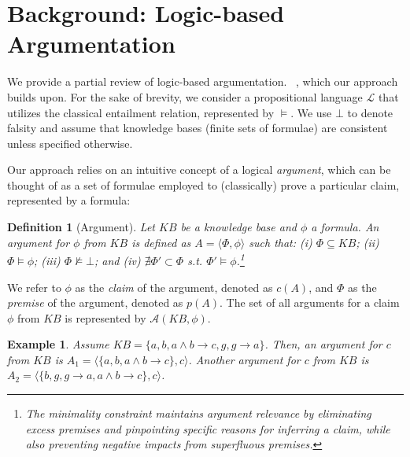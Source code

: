 \documentclass[letterpaper]{article} %
\newtheorem{definition}{{\bf Definition}}
\newtheorem{example}{\bf Example}
\begin{document}
\section{Background: Logic-based Argumentation}
\label{sec:background}





We provide a partial review of logic-based argumentation. ~\cite{besnard2014constructing}, which our approach builds upon.
For the sake of brevity, we consider a propositional language $\mathcal{L}$ that utilizes the classical entailment relation, represented by $\models$. We use $\bot$ to denote falsity and assume that 
knowledge bases (finite sets of formulae) %
are consistent unless specified otherwise.

Our approach relies on an intuitive concept of a logical \emph{argument}, which can be thought of as a set of formulae employed to (classically) prove a particular claim, represented by a formula:

\begin{definition}[Argument]
    Let $KB$ be a knowledge base and $\phi$ a formula. An \emph{argument} for $\phi$ from $KB$ is defined as $A = \langle \Phi, \phi \rangle$ such that: (i) $\Phi \subseteq KB$; (ii) $\Phi \models \phi$; (iii) $\Phi \not \models \bot$; and (iv) $\nexists \Phi' \subset \Phi$ s.t. $\Phi' \models \phi$.\footnote{The minimality constraint maintains argument relevance by eliminating excess premises and pinpointing specific reasons for inferring a claim, while also preventing negative impacts from superfluous premises.}
    \label{def:arg}
\end{definition}


\noindent We refer to $\phi$ as the \emph{claim} of the argument, denoted as $c(A)$, and $\Phi$ as the \emph{premise} of the argument, denoted as $p(A)$. The set of all arguments for a claim $\phi$ from $KB$ is represented by $\mathcal{A}(KB, \phi)$.



\begin{example}
Assume $KB = \{a, b, a \land b \!\rightarrow\! c, g, g \!\rightarrow\! a\}$. Then, an argument for $c$ from $KB$ is $A_1 = \langle \{a, b, a \land b \!\rightarrow\! c \}, c\rangle$. Another argument for $c$ from $KB$ is $A_2 = \langle \{ b, g, g\!\rightarrow\! a , a\land b \!\rightarrow\! c \}, c\rangle$.
\end{example}
\end{document}
